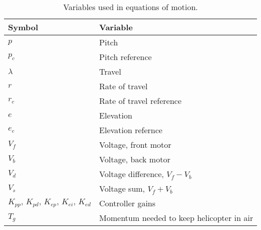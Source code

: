 \begin{table}[tb]
	\centering
	\caption{Variables used in equations of motion.}
	\begin{tabular}{ll}
		\toprule
		Symbol & Variable \\
		\midrule
		$p$ & Pitch\\
		$p_c$ & Pitch reference\\
		$\lambda$ & Travel\\
		$r$ & Rate of travel\\
		$r_c$ & Rate of travel reference\\
		$e$ & Elevation\\
		$e_c$ & Elevation refernce\\
		$V_f$ & Voltage, front motor\\
		$V_b$ & Voltage, back motor\\
		$V_d$ & Voltage difference, $V_f - V_b$\\
		$V_s$ & Voltage sum, $V_f + V_b$\\
		$K_{pp},\,K_{pd},\,K_{ep},\,K_{ei},\,K_{ed}$ & Controller gains\\
		$T_g$ & Momentum needed to keep helicopter in air\\
		\bottomrule
	\end{tabular}
\label{tab:model_variables}
\end{table}